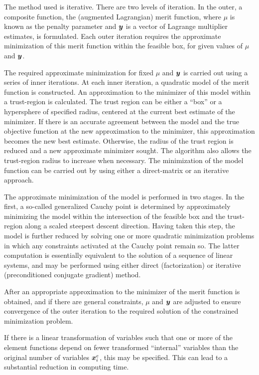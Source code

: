 \documentclass{galahad}
\begin{document}
The method used is iterative. There are two levels of iteration. In
the outer, a composite function, the (augmented Lagrangian) merit function,
where $\mu$ is known as the penalty parameter and ${\bm{y}}$ is a vector of
Lagrange multiplier estimates,
is formulated. Each outer iteration requires the approximate
minimization of this merit function
within the feasible box, for given values of $\mu$ and ${\bm{y}}$.

The required approximate minimization for fixed  $\mu$ and ${\bm{y}}$ is
carried out using a series of inner iterations.  At each inner
iteration, a quadratic model of the merit function is
constructed.  An approximation to the minimizer of this model within a
trust-region is calculated.  The trust region can be either a ``box'' or
a hypersphere of specified radius, centered at the current best estimate
of the minimizer.  If there is an accurate agreement between the model
and the true objective function at the new approximation to the
minimizer, this approximation becomes the new best estimate.  Otherwise,
the radius of the trust region is reduced and a new approximate
minimizer sought.  The algorithm also allows the trust-region radius to
increase when necessary. The minimization of the model function can be
carried out by using either a direct-matrix or an iterative approach.

The approximate minimization of the model is performed in two stages.
In the first, a so-called generalized Cauchy point is determined
by approximately minimizing the model within the intersection of
the feasible box and the trust-region along a scaled steepest descent
direction. Having taken this step, the model is further reduced
by solving one or more quadratic minimization problems in which
any constraints activated at the Cauchy point remain so. The latter
computation is essentially equivalent to the solution of a sequence
of linear systems, and may be performed using either direct (factorization)
or iterative (preconditioned conjugate gradient) method.

After an appropriate approximation to the minimizer of the merit
function is obtained, and if there are general constraints,
$\mu$ and ${\bm{y}}$ are adjusted to ensure
convergence of the outer iteration to the required solution of the
constrained minimization problem.

If there is a linear transformation of variables such that one or more
of the element functions depend on fewer transformed ``internal''
variables than the original number of variables ${\bm{x}}^e_i$, this may be
specified. This can lead to a substantial reduction in computing time.
\end{document}
